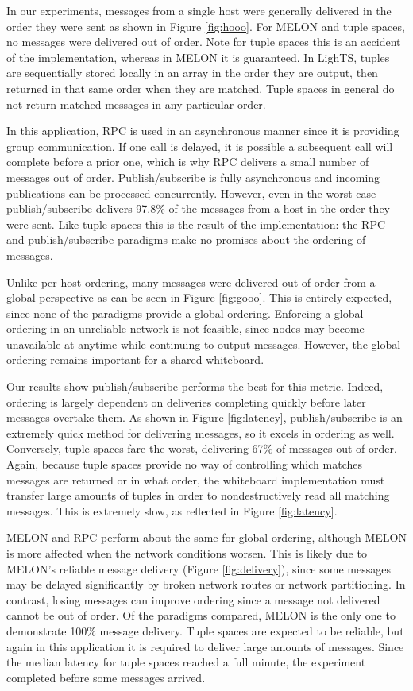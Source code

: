 \documentclass{llncs}
\begin{document}
In our experiments, messages from a single host were generally delivered in the order they were sent as shown in Figure \ref{fig:hooo}. For MELON and tuple spaces, no messages were delivered out of order. Note for tuple spaces this is an accident of the implementation, whereas in MELON it is guaranteed. In LighTS, tuples are sequentially stored locally in an array in the order they are output, then returned in that same order when they are matched. Tuple spaces in general do not return matched messages in any particular order.

In this application, RPC is used in an asynchronous manner since it is providing group communication. If one call is delayed, it is possible a subsequent call will complete before a prior one, which is why RPC delivers a small number of messages out of order. Publish/subscribe is fully asynchronous and incoming publications can be processed concurrently. However, even in the worst case publish/subscribe delivers 97.8\% of the messages from a host in the order they were sent. Like tuple spaces this is the result of the implementation: the RPC and publish/subscribe paradigms make no promises about the ordering of messages. 

Unlike per-host ordering, many messages were delivered out of order from a global perspective as can be seen in Figure \ref{fig:gooo}. This is entirely expected, since none of the paradigms provide a global ordering. Enforcing a global ordering in an unreliable network is not feasible, since nodes may become unavailable at anytime while continuing to output messages. However, the global ordering remains important for a shared whiteboard.

Our results show publish/subscribe performs the best for this metric. Indeed, ordering is largely dependent on deliveries completing quickly before later messages overtake them. As shown in Figure \ref{fig:latency}, publish/subscribe is an extremely quick method for delivering messages, so it excels in ordering as well. Conversely, tuple spaces fare the worst, delivering 67\% of messages out of order. Again, because tuple spaces provide no way of controlling which matches messages are returned or in what order, the whiteboard implementation must transfer large amounts of tuples in order to nondestructively read all matching messages. This is extremely slow, as reflected in Figure \ref{fig:latency}.

MELON and RPC perform about the same for global ordering, although MELON is more affected when the network conditions worsen. This is likely due to MELON's reliable message delivery (Figure \ref{fig:delivery}), since some messages may be delayed significantly by broken network routes or network partitioning. In contrast, losing messages can improve ordering since a message not delivered cannot be out of order. Of the paradigms compared, MELON is the only one to demonstrate 100\% message delivery. Tuple spaces are expected to be reliable, but again in this application it is required to deliver large amounts of messages. Since the median latency for tuple spaces reached a full minute, the experiment completed before some messages arrived.
\end{document}
